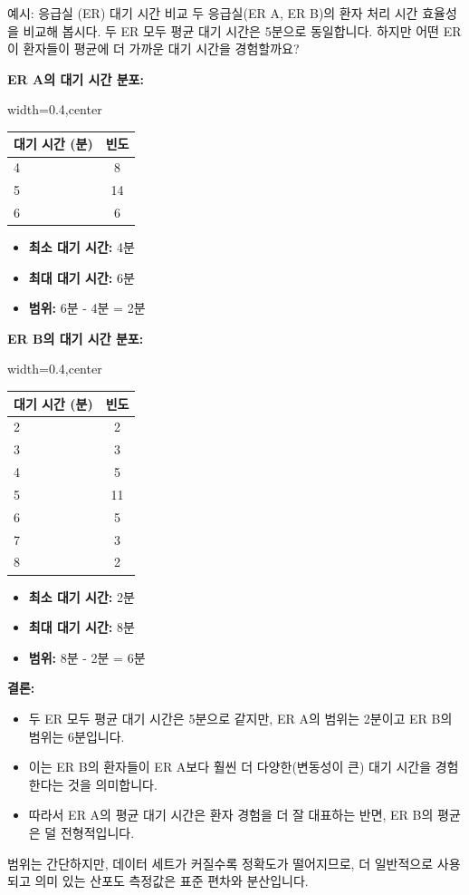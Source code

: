 \documentclass[11pt,a4paper]{article}
\begin{document}
\begin{examplebox}{예시: 응급실 (ER) 대기 시간 비교}
두 응급실(ER A, ER B)의 환자 처리 시간 효율성을 비교해 봅시다. 두 ER 모두 평균 대기 시간은 5분으로 동일합니다.
하지만 어떤 ER이 환자들이 평균에 더 가까운 대기 시간을 경험할까요?

\textbf{ER A의 대기 시간 분포:}
\begin{adjustbox}{width=0.4\textwidth,center}
\begin{tabular}{lc}
\toprule
\textbf{대기 시간 (분)} & \textbf{빈도} \\
\midrule
4 & 8 \\
5 & 14 \\
6 & 6 \\
\bottomrule
\end{tabular}
\end{adjustbox}
\label{tab:er_a_waiting_time}
\begin{itemize}
    \item \textbf{최소 대기 시간:} 4분
    \item \textbf{최대 대기 시간:} 6분
    \item \textbf{범위:} 6분 - 4분 = 2분
\end{itemize}

\textbf{ER B의 대기 시간 분포:}
\begin{adjustbox}{width=0.4\textwidth,center}
\begin{tabular}{lc}
\toprule
\textbf{대기 시간 (분)} & \textbf{빈도} \\
\midrule
2 & 2 \\
3 & 3 \\
4 & 5 \\
5 & 11 \\
6 & 5 \\
7 & 3 \\
8 & 2 \\
\bottomrule
\end{tabular}
\end{adjustbox}
\label{tab:er_b_waiting_time}
\begin{itemize}
    \item \textbf{최소 대기 시간:} 2분
    \item \textbf{최대 대기 시간:} 8분
    \item \textbf{범위:} 8분 - 2분 = 6분
\end{itemize}

\textbf{결론:}
\begin{itemize}
    \item 두 ER 모두 평균 대기 시간은 5분으로 같지만, ER A의 범위는 2분이고 ER B의 범위는 6분입니다.
    \item 이는 ER B의 환자들이 ER A보다 훨씬 더 다양한(변동성이 큰) 대기 시간을 경험한다는 것을 의미합니다.
    \item 따라서 ER A의 평균 대기 시간은 환자 경험을 더 잘 대표하는 반면, ER B의 평균은 덜 전형적입니다.
\end{itemize}
범위는 간단하지만, 데이터 세트가 커질수록 정확도가 떨어지므로, 더 일반적으로 사용되고 의미 있는 산포도 측정값은 표준 편차와 분산입니다.
\end{examplebox}
\end{document}
